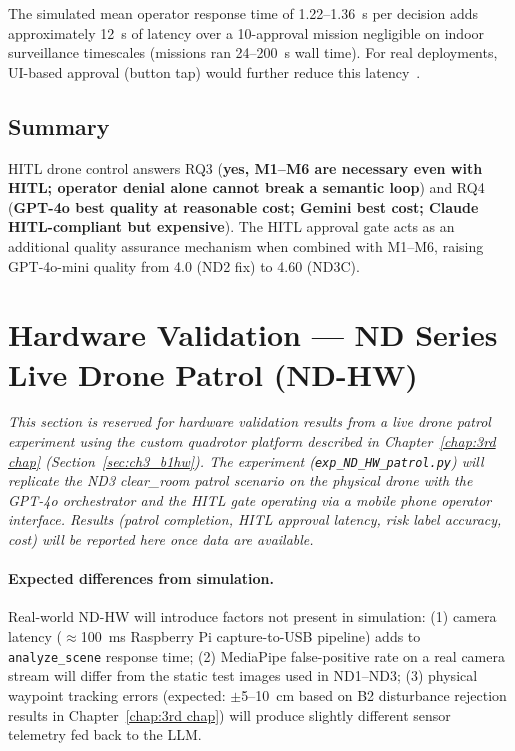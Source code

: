 The simulated mean operator response time of 1.22--1.36~s per decision adds approximately 12~s of latency over a 10-approval mission negligible on indoor surveillance timescales (missions ran 24--200~s wall time).  
For real deployments, UI-based approval (button tap)
would further reduce this latency~\cite{chen2018humanperformance}.

\subsection{Summary}
\label{sec:ch4_nd3_summary}

HITL drone control answers RQ3 (\textbf{yes, M1--M6 are necessary even with HITL; operator denial alone
cannot break a semantic loop}) and RQ4 (\textbf{GPT-4o best quality at reasonable cost; Gemini best cost; Claude HITL-compliant but expensive}).
The HITL approval gate acts as an additional quality assurance mechanism when combined with M1--M6, raising GPT-4o-mini quality from 4.0 (ND2 fix) to 4.60 (ND3C).

\section{Hardware Validation --- ND Series Live Drone Patrol (ND-HW)}
\label{sec:ch4_ndhw}

\textit{This section is reserved for hardware validation results from a live drone patrol
experiment using the custom quadrotor platform described in Chapter~\ref{chap:3rd chap}
(Section~\ref{sec:ch3_b1hw}).  The experiment (\texttt{exp\_ND\_HW\_patrol.py}) will
replicate the ND3 clear\_room patrol scenario on the physical drone with the GPT-4o
orchestrator and the HITL gate operating via a mobile phone operator interface.
Results (patrol completion, HITL approval latency, risk label accuracy, cost) will be
reported here once data are available.}

\paragraph{Expected differences from simulation.}
Real-world ND-HW will introduce factors not present in simulation: (1) camera latency
($\approx$100~ms Raspberry Pi capture-to-USB pipeline) adds to \texttt{analyze\_scene}
response time; (2) MediaPipe false-positive rate on a real camera stream will differ from
the static test images used in ND1--ND3; (3) physical waypoint tracking errors
(expected: $\pm$5--10~cm based on B2 disturbance rejection results in
Chapter~\ref{chap:3rd chap}) will produce slightly different sensor telemetry fed back to
the LLM.

